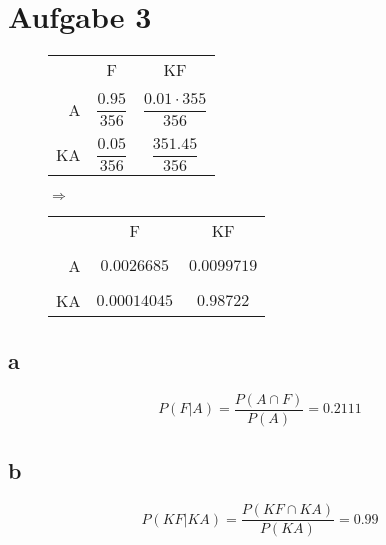 
\section{Aufgabe 3}
\begin{figure}[h!]
\begin{minipage}{0.4\textwidth}
\begin{tabular}{rcc}
    &F                      &KF                             \\\\
A   &$\dfrac{0.95}{356}$    &$\dfrac{0.01 \cdot 355}{356}$  \\\\
KA  &$\dfrac{0.05}{356}$    &$\dfrac{351.45}{356}$          
\end{tabular}
\end{minipage}
\begin{minipage}{0.1\textwidth}
	\Huge$\Rightarrow$\normalsize
\end{minipage}
\begin{minipage}{0.4\textwidth}
\begin{tabular}{rcc}
    &F              &KF             \\\\
A   &$0.0026685$    &$0.0099719$    \\\\
KA  &$0.00014045$   &$0.98722$      
\end{tabular}
\end{minipage}
\end{figure}

\subsection{a}
\[ P(F|A) = \frac{P(A \cap F)}{P(A)} = 0.2111 \]

\subsection{b}
\[ P(KF|KA) = \frac{P(KF \cap KA)}{P(KA)} = 0.99 \]

